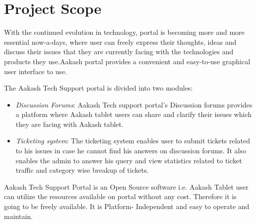 \documentclass[letterpaper,10pt,english]{sphinxmanual}
\begin{document}
\section{Project Scope}
\label{unifieddoc:project-scope}
With the continued evolution in technology, portal is becoming more and more essential now-a-days, where user can freely express their thoughts, ideas and discuss their issues that they are currently facing with the technologies and products they use.Aakash portal provides a convenient and easy-to-use graphical user interface to use.

The Aakash Tech Support portal is divided into two modules:
\begin{itemize}
\item {} 
\emph{Discussion Forums}: Aakash Tech support portal's Discussion forums provides a platform where Aakash tablet users can share and clarify their issues which they are facing with Aakash tablet.

\item {} 
\emph{Ticketing system}: The ticketing system enables user to submit tickets related to his issues in case he cannot find his answers on discussion forums. It also enables the admin to answer his query and view statistics related to ticket traffic and category wise breakup of tickets.

\end{itemize}

Aakash Tech Support Portal is an Open Source software i.e. Aakash Tablet user can utilize the resources available on portal without any cost. Therefore it is going to be freely available. It is Platform- Independent and easy to operate and maintain.
\end{document}
